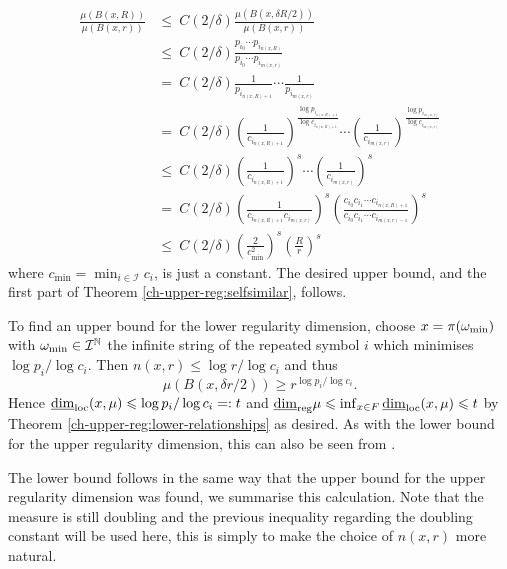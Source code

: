 \begin{align*}
\frac{\mu(B(x,R))}{\mu (B(x,r))}& \le \ C(2/\delta) \frac{\mu(B(x,\delta R/2))}{\mu (B(x,r))}  \\
& \le \ C(2/\delta) \frac{p_{i_0}\cdots p_{i_{n(x,R)}}}{p_{i_0}\cdots p_{i_{m(x,r)}}} \\
& =\  C(2/\delta)  \frac{1}{p_{i_{n(x,R)+1}}} \cdots \frac{1}{p_{i_{m(x,r)}}} \\
& = \ C(2/\delta)  \left(\frac{1}{c_{i_{n(x,R)+1}}}\right)^{\frac{\log p_{i_{n(x,R)+1}}}{\log c_{i_{n(x,R)+1}}} } \cdots \left(\frac{1}{c_{i_{m(x,r)}}}\right)^{\frac{\log p_{i_{m(x,r)}}}{\log c_{i_{m(x,r)} }}} \\
& \le\  C(2/\delta)  \left( \frac{1}{c_{i_{n(x,R)+1}}}\right)^s \cdots \left( \frac{1}{c_{i_{m(x,r)}}}\right)^s \\
& = \ C(2/\delta)  \left(\frac{1}{c_{i_{n(x,R)+1}} c_{i_{m(x,r)}}}\right)^s \left( \frac{c_{i_0}c_{i_1} \cdots c_{i_{n(x,R)+1}}}{c_{i_0}c_{i_1} \cdots c_{i_{m(x,r)-1}}}\right)^s \\
& \le \  C(2/\delta)   \left(\frac{2}{c_{\min}^2}\right)^s \left( \frac{R}{r}\right)^s
\end{align*}
where $c_{\min} = \min_{i\in \mathcal{I}}c_i$, is just a constant. The desired upper bound, and the first part of Theorem \ref{ch-upper-reg:selfsimilar}, follows.


To find an upper bound for the lower regularity dimension, choose $x = \pi (\omega_\textup{min})$ with $\omega_\textup{min} \in \mathcal{I}^{\mathbb{N}}$ the infinite string of the repeated symbol $i$ which minimises $\log p_i / \log c_i$. Then $n(x,r) \le  \log r / \log c_i$ and thus
\[
\mu(B(x,\delta r / 2)) \ge r^{\log p_i / \log c_i}.
\]
Hence $\underline{\dim}_{\textup{loc}}(x,\mu) \leqslant \log p_i/\log c_i =: t$ and $\underline{\dim}_{\textup{reg}} \mu \leqslant \inf_{x\in F} \underline{\dim}_{\textup{loc}}(x,\mu) \leqslant t$ by Theorem \ref{ch-upper-reg:lower-relationships} as desired. As with the lower bound for the upper regularity dimension, this can also be seen from \cite{cawley-mauldin}.

The lower bound follows in the same way that the upper bound for the upper regularity dimension was found, we summarise this calculation. Note that the measure is still doubling and the previous inequality regarding the doubling constant will be used here, this is simply to make the choice of $n(x,r)$ more natural.


